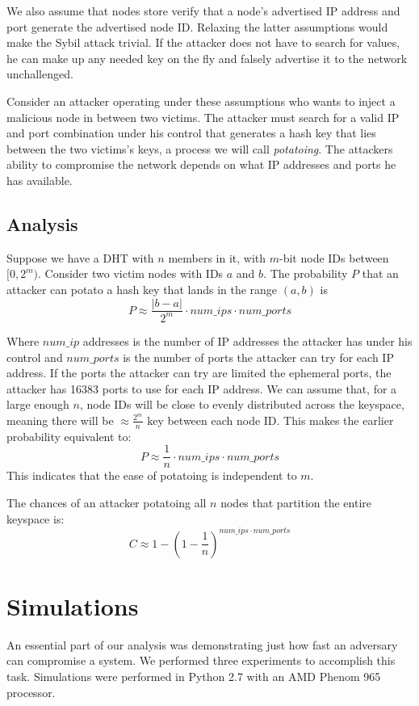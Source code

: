 \documentclass[a4paper]{article}
\begin{document}
We also assume that nodes store verify that a node's advertised IP address and port generate the advertised node ID. 
Relaxing the latter assumptions would  make the Sybil attack trivial. 
If the attacker does not have to search for values, he can make up any needed key on the fly and falsely advertise it to the network unchallenged.

Consider an attacker operating under these assumptions who wants to inject a malicious node in between two victims.
The attacker must search for a valid IP and port combination under his control that generates a hash key that lies between the two victims's keys, a process we will call \textit{potatoing}.
The attackers ability to compromise the network depends on what IP addresses and ports he has available.



\subsection{Analysis}
Suppose we have a DHT with $n$ members in it, with $m$-bit node IDs between $[0,2^{m})$. 
Consider two victim nodes with IDs $a$ and $b$.
The probability $P$ that an attacker can potato a hash key that lands in the range $(a,b)$ is 
$$ P \approx \frac{|b-a|}{2^{m}}\cdot num\_ips \cdot num\_ports  $$

Where $num\_ip$ addresses is the number of IP addresses the attacker has under his control and $num\_ports$ is the number of ports the attacker can try for each IP address.
If the ports the attacker can try are limited the ephemeral ports, the attacker has 16383 ports to use for each IP address.
We can assume that, for a large enough $n$, node IDs will be close to evenly distributed across the keyspace, meaning there will be $\approx \frac{2^{m}}{n}$ key between each node ID.
This makes the earlier probability equivalent to:
$$ P \approx \frac{1}{n}\cdot num\_ips \cdot num\_ports  $$
This indicates that the ease of potatoing is independent to $m$.

The chances of an attacker potatoing all $n$ nodes that partition the entire keyspace is:
$$C \approx  1 - (1 -\frac{1}{n})^{num\_ips \cdot num\_ports}  $$


\section{Simulations}
An essential part of our analysis was demonstrating just how fast an adversary can compromise a system.
We performed three experiments to accomplish this task.
Simulations were performed in Python 2.7  with an AMD Phenom 965 processor.  
\end{document}
